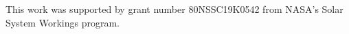 \documentclass{aastex63}
\begin{document}
\acknowledgments
This work was supported by grant number 80NSSC19K0542 from NASA's Solar System Workings program.





\end{document}
